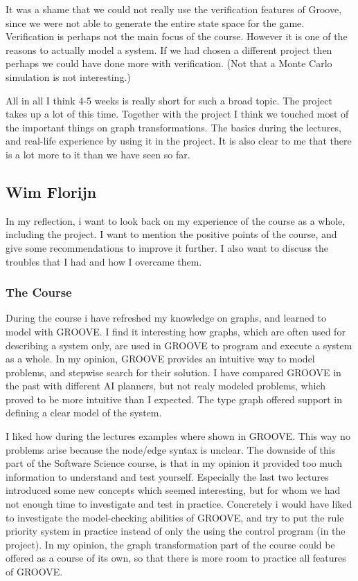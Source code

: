 It was a shame that we could not really use the verification features of Groove, since we were not able to generate the entire state space for the game.
Verification is perhaps not the main focus of the course. However it is one of the reasons to actually model a system.
If we had chosen a different project then perhaps we could have done more with verification. (Not that a Monte Carlo simulation is not interesting.)

All in all I think 4-5 weeks is really short for such a broad topic. The project takes up a lot of this time. 
Together with the project I think we touched most of the important things on graph transformations. The basics during the lectures, and real-life experience by using it in the project.
It is also clear to me that there is a lot more to it than we have seen so far.

\subsection{Wim Florijn}

In my reflection, i want to look back on my experience of the course as a whole, including the project.
I want to mention the positive points of the course, and give some recommendations to improve it further.
I also want to discuss the troubles that I had and how I overcame them.

\subsubsection{The Course}
During the course i have refreshed my knowledge on graphs, and learned to model with GROOVE.
I find it interesting how graphs, which are often used for describing a system only, are used in GROOVE to program and execute a system as a whole.
In my opinion, GROOVE provides an intuitive way to model problems, and stepwise search for their solution.
I have compared GROOVE in the past with different AI planners, but not realy modeled problems, which proved to be more intuitive than I expected.
The type graph offered support in defining a clear model of the system.

\vspace{6pt}

I liked how during the lectures examples where shown in GROOVE. This way no problems arise because the node/edge syntax is unclear.
The downside of this part of the Software Science course, is that in my opinion it provided too much information to understand and test yourself. Especially the last two lectures introduced some new concepts which seemed interesting, but for whom we had not enough time to investigate and test in practice.
Concretely i would have liked to investigate the model-checking abilities of GROOVE, and try to put the rule priority system in practice instead of only the using the control program (in the project).
In my opinion, the graph transformation part of the course could be offered as a course of its own, so that there is more room to practice all features of GROOVE.

